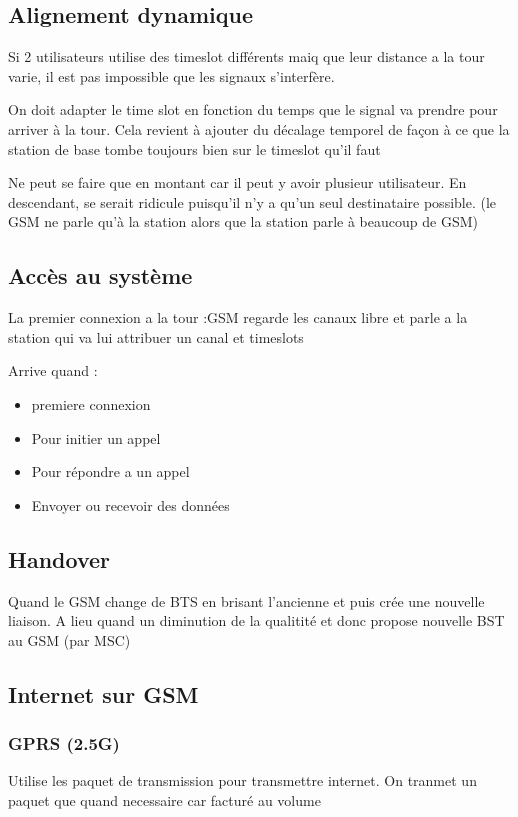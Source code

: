  		
 	\subsection{Alignement dynamique}
 		Si 2 utilisateurs utilise des timeslot différents maiq que leur distance a la tour varie, il est pas impossible que les signaux s'interfère.
 		
 		On doit adapter le time slot en fonction du temps que le signal va prendre pour arriver à la tour. Cela revient à ajouter du décalage temporel de façon à ce que la station de base tombe toujours bien sur le timeslot qu’il faut
 		
 		Ne peut se faire que en montant car il peut y avoir plusieur utilisateur. En descendant,  se serait ridicule puisqu’il n’y a qu’un seul destinataire possible. (le GSM ne parle qu’à la station alors que la station parle à beaucoup de GSM)
 		
 	\subsection{Accès au système}
 	
 		La premier connexion a la tour :GSM regarde les canaux libre et parle a la station qui va lui attribuer un canal et timeslots
 		
 		Arrive quand :
 		\begin{itemize}
 			\item premiere connexion
 			\item Pour initier un appel
 			\item Pour répondre a un appel
 			\item Envoyer ou recevoir des données
 		\end{itemize}
 		
 	\subsection{Handover}
 		Quand le GSM change de BTS en brisant l'ancienne et puis crée une nouvelle liaison. A lieu quand  un diminution de la qualitité et donc propose nouvelle BST au GSM (par MSC) 
 		
 	\subsection{Internet sur GSM}
 		\subsubsection{GPRS (2.5G)}
 			Utilise les paquet de transmission pour transmettre internet. On tranmet un paquet que quand necessaire car facturé au volume
 			
